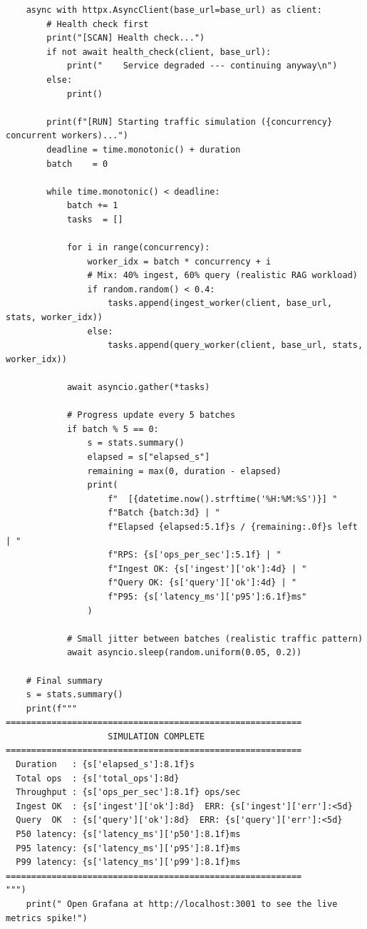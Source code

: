 \documentclass[12pt,a4paper]{report}
\begin{document}
\begin{lstlisting}
    async with httpx.AsyncClient(base_url=base_url) as client:
        # Health check first
        print("[SCAN] Health check...")
        if not await health_check(client, base_url):
            print("    Service degraded --- continuing anyway\n")
        else:
            print()

        print(f"[RUN] Starting traffic simulation ({concurrency} concurrent workers)...")
        deadline = time.monotonic() + duration
        batch    = 0

        while time.monotonic() < deadline:
            batch += 1
            tasks  = []

            for i in range(concurrency):
                worker_idx = batch * concurrency + i
                # Mix: 40% ingest, 60% query (realistic RAG workload)
                if random.random() < 0.4:
                    tasks.append(ingest_worker(client, base_url, stats, worker_idx))
                else:
                    tasks.append(query_worker(client, base_url, stats, worker_idx))

            await asyncio.gather(*tasks)

            # Progress update every 5 batches
            if batch % 5 == 0:
                s = stats.summary()
                elapsed = s["elapsed_s"]
                remaining = max(0, duration - elapsed)
                print(
                    f"  [{datetime.now().strftime('%H:%M:%S')}] "
                    f"Batch {batch:3d} | "
                    f"Elapsed {elapsed:5.1f}s / {remaining:.0f}s left | "
                    f"RPS: {s['ops_per_sec']:5.1f} | "
                    f"Ingest OK: {s['ingest']['ok']:4d} | "
                    f"Query OK: {s['query']['ok']:4d} | "
                    f"P95: {s['latency_ms']['p95']:6.1f}ms"
                )

            # Small jitter between batches (realistic traffic pattern)
            await asyncio.sleep(random.uniform(0.05, 0.2))

    # Final summary
    s = stats.summary()
    print(f"""
==========================================================
                    SIMULATION COMPLETE                   
==========================================================
  Duration   : {s['elapsed_s']:8.1f}s                                
  Total ops  : {s['total_ops']:8d}                                
  Throughput : {s['ops_per_sec']:8.1f} ops/sec                         
  Ingest OK  : {s['ingest']['ok']:8d}  ERR: {s['ingest']['err']:<5d}               
  Query  OK  : {s['query']['ok']:8d}  ERR: {s['query']['err']:<5d}               
  P50 latency: {s['latency_ms']['p50']:8.1f}ms                              
  P95 latency: {s['latency_ms']['p95']:8.1f}ms                              
  P99 latency: {s['latency_ms']['p99']:8.1f}ms                              
==========================================================
""")
    print(" Open Grafana at http://localhost:3001 to see the live metrics spike!")



\end{lstlisting}
\end{document}
